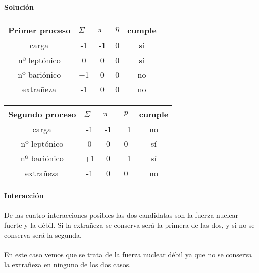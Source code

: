 \documentclass[12pt, a4paper]{article}
\begin{document}
    \paragraph{\textbf{Solución}}

    \paragraph{}

    \begin{center}
    \begin{tabular}{ c c c c c }
      \hline
      \textbf{Primer proceso} & $\Sigma^{-}$ & $\pi^{-}$ & $\eta$ & cumple \\
      \hline
      carga & -1 & -1 & 0 & sí \\
      nº leptónico & 0 & 0 & 0 & sí \\
      nº bariónico & +1 & 0 & 0 & no \\
      extrañeza & -1 & 0 & 0 & no \\
      \hline
    \end{tabular}
    \end{center}

    \vspace{0.2cm}


    \begin{center}
    \begin{tabular}{ c c c c c }
      \hline
      \textbf{Segundo proceso} & $\Sigma^{-}$ & $\pi^{-}$ & $p$ & cumple \\
      \hline
      carga & -1 & -1 & +1 & no \\
      nº leptónico & 0 & 0 & 0 & sí \\
      nº bariónico & +1 & 0 & +1 & sí \\
      extrañeza & -1 & 0 & 0 & no \\
      \hline
    \end{tabular}
    \end{center}

    \raggedright
    \paragraph{Interacción} De las cuatro interacciones posibles las dos candidatas son la fuerza nuclear
    fuerte y la débil. Si la extrañeza se conserva será la primera de las dos, y si no se conserva
    será la segunda.

    \paragraph{} En este caso vemos que se trata de la fuerza nuclear débil ya que no se conserva la extrañeza
    en ninguno de los dos casos.
\end{document}
